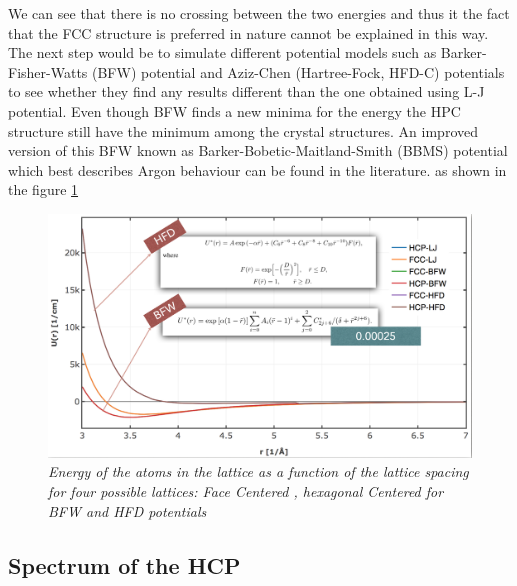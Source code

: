 \documentclass[a4paper]{article}
\begin{document}
We can see that there is no crossing between the two energies and thus it the fact that the FCC structure is preferred in nature cannot be explained in this way.
The next step would be to simulate different potential models such as Barker-Fisher-Watts (BFW) potential\cite{bfw} and Aziz-Chen (Hartree-Fock, HFD-C) potentials\cite{hfd}
 to see whether they find any results different than the one obtained using L-J potential. Even though BFW finds a new minima for the energy the HPC structure still have the minimum among
 the crystal structures. An improved version of this BFW known as Barker-Bobetic-Maitland-Smith (BBMS) potential\cite{bbms} which best describes Argon behaviour can be found in the literature. as shown in the figure \ref{diff-pot}
 \begin{figure}[h]\label{diff-pot}
    \centering
    \includegraphics[width=12cm]{diff_pot.png}
    \caption{\it \label{diff-pot}Energy of the atoms in the lattice as a function of the lattice spacing for four possible lattices: Face Centered , hexagonal Centered for BFW and HFD potentials }
\end{figure}
\subsection{Spectrum of the HCP}
\end{document}
